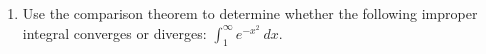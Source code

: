\documentclass[12pt]{article}
\begin{document}
\begin{enumerate}

%
%
%
%
%
%
%
%
%
%
%
%
%
%
%
%
%
%
\newpage
\item Use the comparison theorem to determine whether the following improper integral converges or diverges: $\displaystyle\int_1^{\infty} e^{-x^2} \ dx$.
\end{enumerate} 
\end{document}
